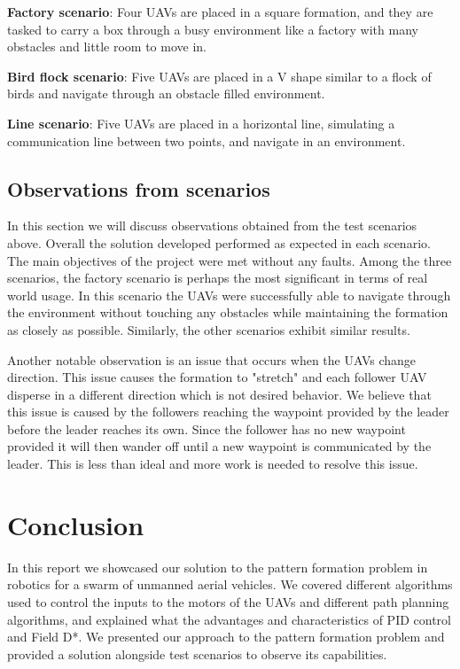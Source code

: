 \textbf{Factory scenario}: Four UAVs are placed in a square formation, and they are tasked to carry a box through a 
busy environment like a factory with many obstacles and little room to move in. 

\textbf{Bird flock scenario}: Five UAVs are placed in a V shape similar to a flock of birds and navigate through an
obstacle filled environment.

\textbf{Line scenario}: Five UAVs are placed in a horizontal line, simulating a communication line between two points, and 
navigate in an environment.

\section{Observations from scenarios}

In this section we will discuss observations obtained from the test scenarios above. 
Overall the solution developed performed as expected in each scenario. The main objectives
of the project were met without any faults. Among the three scenarios, the factory
scenario is perhaps the most significant in terms of real world usage. In this scenario
the UAVs were successfully able to navigate through the environment without touching
any obstacles while maintaining the formation as closely as possible. Similarly, 
the other scenarios exhibit similar results. 

Another notable observation is an issue that occurs when the UAVs change direction. 
This issue causes the formation to "stretch" and each follower UAV disperse in a 
different direction which is not desired behavior. We believe that this issue is
caused by the followers reaching the waypoint provided by the leader before the 
leader reaches its own. Since the follower has no new waypoint provided it will then 
wander off until a new waypoint is communicated by the leader. This is less than
ideal and more work is needed to resolve this issue.

\chapter{Conclusion}

In this report we showcased our solution to the pattern formation problem in robotics
for a swarm of unmanned aerial vehicles. We covered different algorithms used to 
control the inputs to the motors of the UAVs and different path planning algorithms,
and explained what the advantages and characteristics of PID control and Field D*. 
We presented our approach to the pattern formation problem and provided a solution 
alongside test scenarios to observe its capabilities.

\printbibliography

